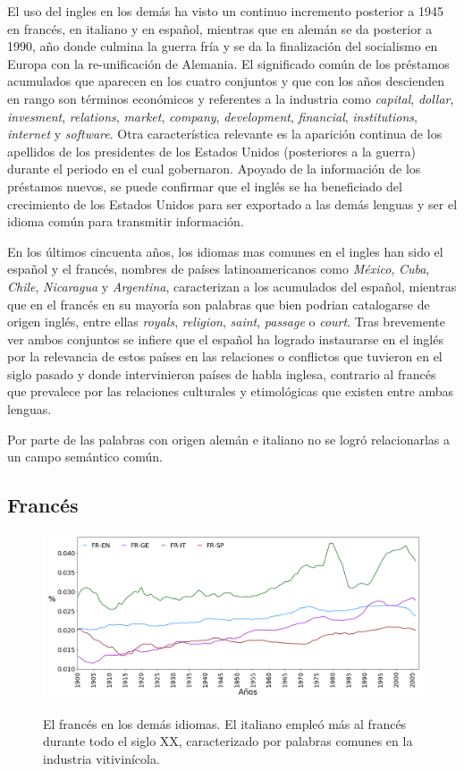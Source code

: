 El uso del ingles en los demás ha visto un continuo incremento posterior a 1945 en francés, en italiano y en español, mientras que en  alemán se da posterior a 1990, año donde culmina la guerra fría y se da la finalización del socialismo en Europa con la re-unificación de Alemania. El significado común de los   préstamos acumulados que aparecen en los cuatro conjuntos y que con los años descienden en rango son términos económicos y referentes a la industria como  \textit{capital}, \textit{dollar}, \textit{invesment}, \textit{relations}, \textit{market}, \textit{company}, \textit{development}, \textit{financial},  \textit{institutions}, \textit{internet} y \textit{software}. Otra característica relevante es la aparición continua de los apellidos de los presidentes de los Estados Unidos (posteriores a la guerra) durante el periodo en el cual gobernaron.  Apoyado de la información de los préstamos nuevos, se puede confirmar que el inglés se ha beneficiado del crecimiento de los Estados Unidos para ser exportado a las demás lenguas y ser el idioma común para transmitir información.   


En los últimos cincuenta años, los idiomas mas comunes en el ingles han sido el español y el francés,  nombres de países latinoamericanos como \textit{México}, \textit{Cuba}, \textit{Chile}, \textit{Nicaragua} y \textit{Argentina}, caracterizan a los acumulados del español, mientras que en el francés en su mayoría son palabras que bien podrian catalogarse de origen inglés, entre ellas \textit{royals}, \textit{religion}, \textit{saint}, \textit{passage} o \textit{court}. Tras brevemente ver ambos conjuntos se infiere que el español ha logrado instaurarse en el inglés por la relevancia de estos países en las relaciones o conflictos que tuvieron en el siglo pasado y donde intervinieron países de habla inglesa, contrario  al francés que prevalece por las relaciones culturales y etimológicas que existen entre ambas lenguas.

Por parte de las palabras con origen alemán e italiano no se logró relacionarlas a un campo semántico común. 


\clearpage
\subsection{Francés}

\begin{figure}[h!]
	\centering
	\includegraphics[scale=.36]{Cap_4/PF1_S2_FR.png}
	\label{fig.ST_a_FR}
	\caption{El francés en los demás idiomas. El italiano empleó más al francés durante todo el siglo XX, caracterizado por palabras comunes en la industria vitivinícola.}
\end{figure}


